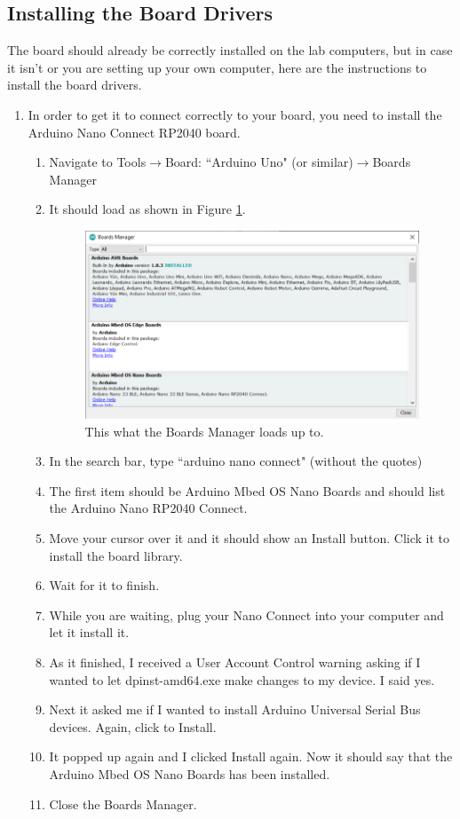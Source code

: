 \subsection{Installing the Board Drivers}
The board should already be correctly installed on the lab computers, but in case it isn't or you are setting 
up your own computer, here are the instructions to install the board drivers. 
\begin{enumerate}
	\item In order to get it to connect correctly to your board, you need to install the Arduino Nano Connect RP2040 board.
	\begin{enumerate}
		\item Navigate to Tools$\rightarrow$Board: ``Arduino Uno" (or similar)$\rightarrow$Boards Manager
		\item It should load as shown in Figure \ref{fig:boardsManager}.
        \begin{figure}[!htb]
            \centering
            \includegraphics[scale=0.9]{arduinoStart/BoardsManager.PNG}
            \caption{This what the Boards Manager loads up to.}
            \label{fig:boardsManager}
        \end{figure} 
        \item In the search bar, type ``arduino nano connect" (without the quotes)
		\item The first item should be Arduino Mbed OS Nano Boards and should list the Arduino Nano RP2040 Connect.
		\item Move your cursor over it and it should show an Install button. Click it to install the board library.
		\item Wait for it to finish.
		\item While you are waiting, plug your Nano Connect into your computer and let it install it.
		\item As it finished, I received a User Account Control warning asking if I wanted to let dpinst-amd64.exe make changes to my device. I said yes.
		\item Next it asked me if I wanted to install Arduino Universal Serial Bus devices. Again, click to Install.
		\item It popped up again and I clicked Install again. Now it should say that the Arduino Mbed OS Nano Boards has been installed.
		\item Close the Boards Manager.
	\end{enumerate}
\end{enumerate}

